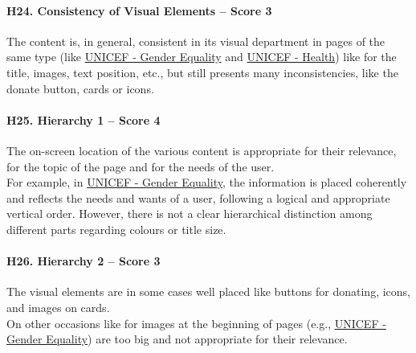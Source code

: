 \paragraph*{H24. Consistency of Visual Elements – Score 3}
The content is, in general, consistent in its visual department in pages of the same type (like \href{https://www.unicef.org/gender-equality}{UNICEF - Gender Equality} and \href{https://www.unicef.org/health}{UNICEF - Health}) like for the title, images, text position, etc., but still presents many inconsistencies, like the donate button, cards or icons.

\paragraph*{H25. Hierarchy 1 – Score 4}
The on-screen location of the various content is appropriate for their relevance, for the topic of the page and for the needs of the user.\\
For example, in \href{https://www.unicef.org/gender-equality}{UNICEF - Gender Equality}, the information is placed coherently and reflects the needs and wants of a user, following a logical and appropriate vertical order. However, there is not a clear hierarchical distinction among different parts regarding colours or title size.

\paragraph*{H26. Hierarchy 2 – Score 3}
The visual elements are in some cases well placed like buttons for donating, icons, and images on cards.\\
On other occasions like for images at the beginning of pages (e.g., \href{https://www.unicef.org/gender-equality}{UNICEF - Gender Equality}) are too big and not appropriate for their relevance.

